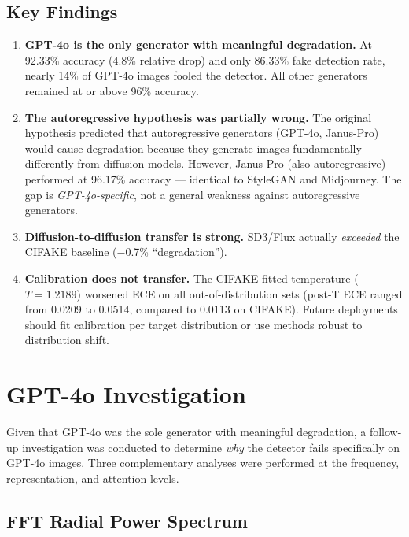 \documentclass[12pt,a4paper]{article}
\begin{document}
\subsection{Key Findings}

\begin{enumerate}[noitemsep]
    \item \textbf{GPT-4o is the only generator with meaningful degradation.} At 92.33\% accuracy (4.8\% relative drop) and only 86.33\% fake detection rate, nearly 14\% of GPT-4o images fooled the detector. All other generators remained at or above 96\% accuracy.

    \item \textbf{The autoregressive hypothesis was partially wrong.} The original hypothesis predicted that autoregressive generators (GPT-4o, Janus-Pro) would cause degradation because they generate images fundamentally differently from diffusion models. However, Janus-Pro (also autoregressive) performed at 96.17\% accuracy --- identical to StyleGAN and Midjourney. The gap is \emph{GPT-4o-specific}, not a general weakness against autoregressive generators.

    \item \textbf{Diffusion-to-diffusion transfer is strong.} SD3/Flux actually \emph{exceeded} the CIFAKE baseline ($-$0.7\% ``degradation'').

    \item \textbf{Calibration does not transfer.} The CIFAKE-fitted temperature ($T = 1.2189$) worsened ECE on all out-of-distribution sets (post-T ECE ranged from 0.0209 to 0.0514, compared to 0.0113 on CIFAKE). Future deployments should fit calibration per target distribution or use methods robust to distribution shift.
\end{enumerate}

\section{GPT-4o Investigation}
\label{sec:gpt4o}

Given that GPT-4o was the sole generator with meaningful degradation, a follow-up investigation was conducted to determine \emph{why} the detector fails specifically on GPT-4o images. Three complementary analyses were performed at the frequency, representation, and attention levels.

\subsection{FFT Radial Power Spectrum}
\end{document}
